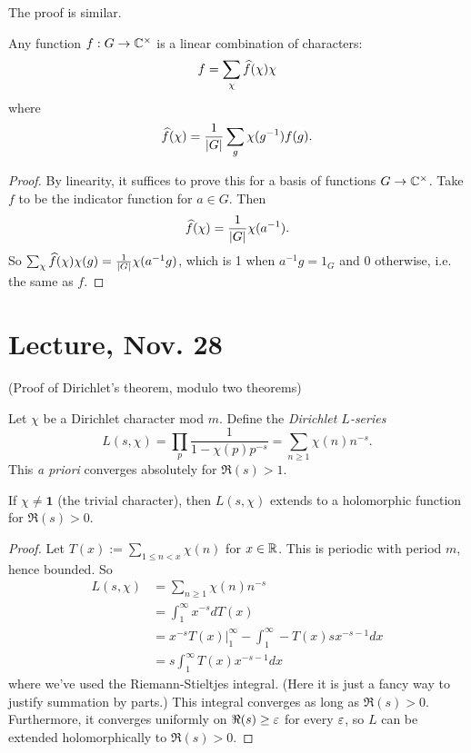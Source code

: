 \documentclass[11pt]{amsart}
\begin{document}
The proof is similar.

\begin{thm}
    Any function $f:G\to \mathbb{C}^{\times}$ is a linear combination of characters:
    \[f = \sum_{\chi} \widehat{f}(\chi) \chi\]
    where
    \[\widehat{f}(\chi) = \frac{1}{|G|} \sum_g \chi(g^{-1})f(g).\]
\end{thm}

\begin{proof}
    By linearity, it suffices to prove this for a basis of functions $G\to \mathbb{C}^\times$. Take $f$ to be the indicator function for $a\in G$. Then
    \[\widehat{f}(\chi) = \frac{1}{|G|}\chi(a^{-1}).\]
    So $\sum_\chi \widehat{f}(\chi)\chi(g) = \frac{1}{|G|}\chi(a^{-1}{g})$, which is 1 when $a^{-1}g = 1_G$ and $0$ otherwise, i.e. the same as $f$.
\end{proof}


\section{Lecture, Nov. 28}

(Proof of Dirichlet's theorem, modulo two theorems)


\begin{defn}
    Let $\chi$ be a Dirichlet character mod $m$. Define the \emph{Dirichlet $L$-series}
    \[L(s,\chi) = \prod_p \frac{1}{1-\chi(p)p^{-s}} = \sum_{n\ge 1} \chi(n)n^{-s}.\]
    This \textit{a priori} converges absolutely for $\Re(s)>1$.
\end{defn}


\begin{prop}
    If $\chi\neq \mathbf{1}$ (the  trivial character), then $L(s,\chi)$ extends to a holomorphic function for $\Re(s) > 0$.
\end{prop}

\begin{proof}
    Let $T(x) := \sum_{1\le n<x} \chi(n)$ for $x\in \mathbb{R}$. This is periodic with period $m$, hence bounded. So
    \begin{align*}
    L(s,\chi) &= \sum_{n\ge 1}\chi(n)n^{-s} \\
    &= \int_1^\infty x^{-s}dT(x) \\
    &= x^{-s}T(x)|_1^\infty - \int_1^\infty -T(x)sx^{-s-1}dx \\
    &= s\int_1^\infty T(x)x^{-s-1}dx 
    \end{align*}
    where we've used the Riemann-Stieltjes integral. (Here it is just a fancy way to justify summation by parts.) This integral converges as long as $\Re(s)>0$. Furthermore, it converges uniformly on $\Re(s) \ge \varepsilon$ for every $\varepsilon$, so $L$ can be extended holomorphically to $\Re(s) > 0$.
\end{proof}
\end{document}
